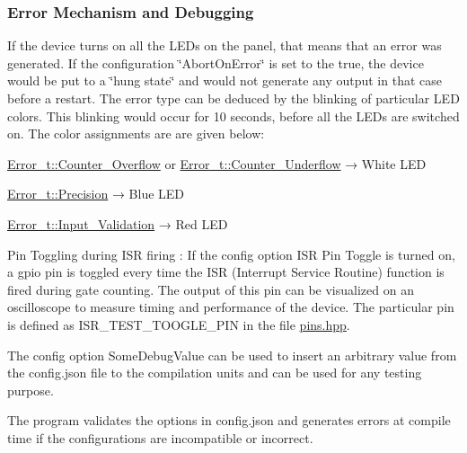 \subsubsection*{Error Mechanism and Debugging}


\begin{DoxyItemize}
\item If the device turns on all the L\+E\+Ds on the panel, that means that an error was generated. If the configuration {\ttfamily \char`\"{}\+Abort\+On\+Error\char`\"{}} is set to the {\ttfamily true}, the device would be put to a \char`\"{}hung state\char`\"{} and would not generate any output in that case before a restart. The error type can be deduced by the blinking of particular L\+ED colors. This blinking would occur for 10 seconds, before all the L\+E\+Ds are switched on. The color assignments are are given below\+:
\begin{DoxyEnumerate}
\item {\ttfamily \hyperlink{errors_8hpp_a4e8c0d09726859e3d3369c0da5a1aa7fa8347bab2e74e4a640d76c916306a1a36}{Error\+\_\+t\+::\+Counter\+\_\+\+Overflow}} or {\ttfamily \hyperlink{errors_8hpp_a4e8c0d09726859e3d3369c0da5a1aa7fa02b02f5e5e61f24acdd91338b95997da}{Error\+\_\+t\+::\+Counter\+\_\+\+Underflow}} → White L\+ED
\item {\ttfamily \hyperlink{errors_8hpp_a4e8c0d09726859e3d3369c0da5a1aa7fabe5edab59de4ea30531374e506b03822}{Error\+\_\+t\+::\+Precision}} → Blue L\+ED
\item {\ttfamily \hyperlink{errors_8hpp_a4e8c0d09726859e3d3369c0da5a1aa7fa7e748bca7005cc737bad51b247997421}{Error\+\_\+t\+::\+Input\+\_\+\+Validation}} → Red L\+ED
\end{DoxyEnumerate}
\item Pin Toggling during I\+SR firing \+: If the config option {\ttfamily I\+SR Pin Toggle} is turned on, a {\ttfamily gpio pin} is toggled every time the I\+SR (Interrupt Service Routine) function is fired during gate counting. The output of this pin can be visualized on an oscilloscope to measure timing and performance of the device. The particular pin is defined as {\ttfamily I\+S\+R\+\_\+\+T\+E\+S\+T\+\_\+\+T\+O\+O\+G\+L\+E\+\_\+\+P\+IN} in the file {\ttfamily \hyperlink{pins_8hpp}{pins.\+hpp}}.
\item The config option {\ttfamily Some\+Debug\+Value} can be used to insert an arbitrary value from the {\ttfamily config.\+json} file to the compilation units and can be used for any testing purpose.
\item The program validates the options in {\ttfamily config.\+json} and generates errors at compile time if the configurations are incompatible or incorrect.
\end{DoxyItemize}

